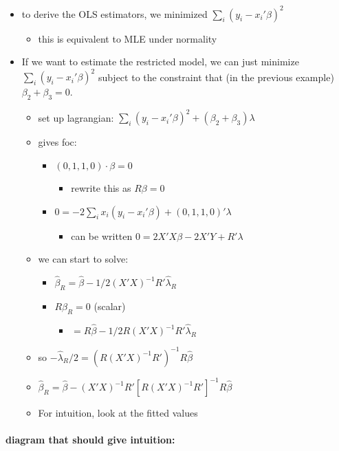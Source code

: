 \begin{itemize}
\item to derive the OLS estimators, we minimized $\sum_i (y_i -
      x_i'\beta)^2$
\begin{itemize}
\item this is equivalent to MLE under normality
\end{itemize}
\item If we want to estimate the restricted model, we can just minimize
      $\sum_i (y_i - x_i'\beta)^2$ subject to the constraint that (in
      the previous example) $\beta_2 + \beta_3 = 0$.
\begin{itemize}
\item set up lagrangian: $\sum_i (y_i - x_i'\beta)^2 + (\beta_2 + \beta_3)\lambda$
\item gives foc:
\begin{itemize}
\item $(0, 1, 1, 0) \cdot \beta = 0$
\begin{itemize}
\item rewrite this as $R\beta = 0$
\end{itemize}
\item $0 = - 2 \sum_i x_i (y_i - x_i'\beta) + (0, 1, 1, 0)' \lambda$
\begin{itemize}
\item can be written $0 = 2 X'X\beta - 2 X'Y + R' \lambda$
\end{itemize}
\end{itemize}
\item we can start to solve:
\begin{itemize}
\item $\hat\beta_R = \hat\beta - 1/2 (X'X)^{-1} R' \hat\lambda_R$
\item $R \hat\beta_R = 0$ (scalar)
\begin{itemize}
\item $= R \hat\beta - 1/2 R (X'X)^{-1} R' \hat\lambda_R$
\end{itemize}
\end{itemize}
\item so $- \hat\lambda_R/2 = (R (X'X)^{-1} R')^{-1} R\hat\beta$
\item $\hat\beta_R = \hat\beta - (X'X)^{-1} R' [R(X'X)^{-1}R']^{-1} R\hat\beta$
\item For intuition, look at the fitted values
\end{itemize}
\end{itemize}
\paragraph{diagram that should give intuition:}
